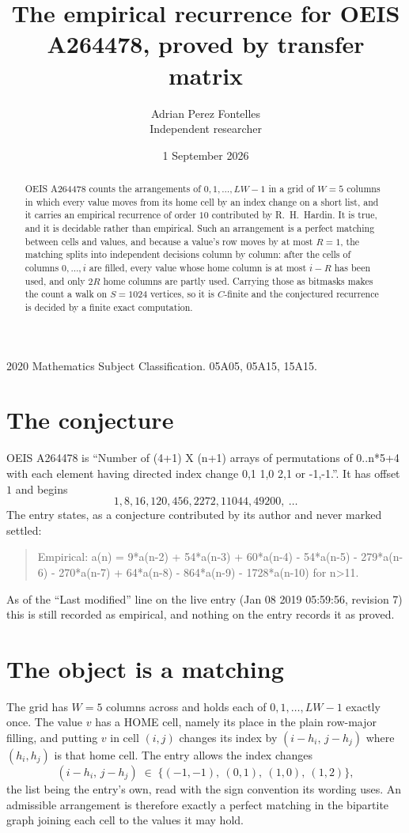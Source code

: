 \documentclass[11pt,a4paper]{article}
\title{The empirical recurrence for OEIS A264478, proved by transfer matrix}
\author{Adrian Perez Fontelles\\ \small Independent researcher}
\date{1 September 2026}
\theoremstyle{plain}
\theoremstyle{definition}
\begin{document}
\maketitle

\begin{abstract}
OEIS A264478 counts the arrangements of $0,1,\dots,LW-1$ in a grid of $W=5$ columns in which
every value moves from its home cell by an index change on a short list, and it carries an
empirical recurrence of order $10$ contributed by R.~H.~Hardin. It is true, and it is
decidable rather than empirical. Such an arrangement is a perfect matching between cells and
values, and because a value's row moves by at most $R=1$, the matching splits into
independent decisions column by column: after the cells of columns $0,\dots,i$ are filled,
every value whose home column is at most $i-R$ has been used, and only $2R$ home columns are
partly used. Carrying those as bitmasks makes the count a walk on $S=1024$ vertices, so it is
$C$-finite and the conjectured recurrence is decided by a finite exact computation.
\end{abstract}

\noindent\small 2020 Mathematics Subject Classification. 05A05, 05A15, 15A15.\normalsize

\section{The conjecture}

OEIS A264478 is ``Number of (4+1) X (n+1) arrays of permutations of 0..n*5+4 with each element having directed index change 0,1 1,0 2,1 or -1,-1.''. It has offset $1$ and begins
\[
1, 8, 16, 120, 456, 2272, 11044, 49200,\ \dots
\]
The entry states, as a conjecture contributed by its author and never marked settled:
\begin{quote}
Empirical: a(n) = 9*a(n-2) + 54*a(n-3) + 60*a(n-4) - 54*a(n-5) - 279*a(n-6) - 270*a(n-7) + 64*a(n-8) - 864*a(n-9) - 1728*a(n-10) for n>11.
\end{quote}
As of the ``Last modified'' line on the live entry (Jan 08 2019 05:59:56, revision 7) this is still
recorded as empirical, and nothing on the entry records it as proved.

\section{The object is a matching}

The grid has $W=5$ columns across and holds each of $0,1,\dots,LW-1$ exactly once. The value
$v$ has a HOME cell, namely its place in the plain row-major filling, and putting $v$ in cell
$(i,j)$ changes its index by $(i-h_i,\,j-h_j)$ where $(h_i,h_j)$ is that home cell. The entry
allows the index changes
\[
(i-h_i,\,j-h_j)\;\in\;\{(-1,-1),\ (0,1),\ (1,0),\ (1,2)\},
\]
the list being the entry's own, read with the sign convention its wording uses. An admissible
arrangement is therefore exactly a perfect matching in the bipartite graph joining each cell to
the values it may hold.
\end{document}
